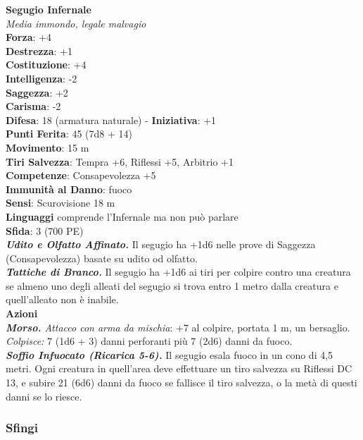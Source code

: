 \begin{multicols}{2}
\medskip\textbf{Segugio Infernale}\\
\emph{Media immondo, legale malvagio}\\
\textbf{Forza}: +4\\
\textbf{Destrezza}: +1\\
\textbf{Costituzione}: +4\\
\textbf{Intelligenza}: -2\\
\textbf{Saggezza}: +2\\
\textbf{Carisma}: -2\\
\textbf{Difesa}: 18 (armatura naturale) - \textbf{Iniziativa}: +1\\
\textbf{Punti Ferita}: 45 (7d8 + 14)\\
\textbf{Movimento}: 15 m\\
\textbf{Tiri Salvezza}: Tempra +6, Riflessi +5, Arbitrio +1\\
\textbf{Competenze}: Consapevolezza +5\\
\textbf{Immunità al Danno}: fuoco\\
\textbf{Sensi}: Scurovisione 18 m\\
\textbf{Linguaggi} comprende l'Infernale ma non può parlare\\
\textbf{Sfida}: 3 (700 PE)\smallskip\\
\emph{\textbf{Udito e Olfatto Affinato.}} Il segugio ha +1d6 nelle prove di Saggezza (Consapevolezza) basate su udito od olfatto.\\
\emph{\textbf{Tattiche di Branco.}} Il segugio ha +1d6 ai tiri per colpire contro una creatura se almeno uno degli alleati del segugio si trova entro 1 metro dalla creatura e quell'alleato non è inabile.\\
\smallskip\textbf{Azioni}\\
\emph{\textbf{Morso.} Attacco con arma da mischia}: +7 al colpire, portata 1 m, un bersaglio.\\
\emph{Colpisce:} 7 (1d6 + 3) danni perforanti più 7 (2d6) danni da fuoco.\\
\emph{\textbf{Soffio Infuocato (Ricarica 5-6).}} Il segugio esala fuoco in un cono di 4,5 metri. Ogni creatura in quell'area deve effettuare un tiro salvezza su Riflessi DC  13, e subire 21 (6d6) danni da fuoco se fallisce il tiro salvezza, o la metà di questi danni se lo riesce.\\

\subsubsection{Sfingi}


\end{multicols}
